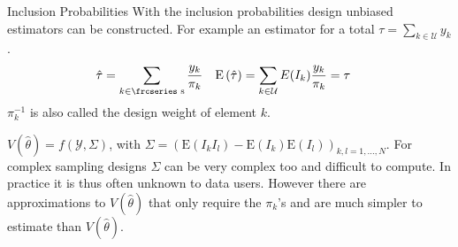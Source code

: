 \documentclass{beamer}\usepackage[]{graphicx}\usepackage[]{color}
\newcommand{\textfrc}[1]{{\frcseries#1}}
\newcommand{\mathfrc}[1]{\text{\textfrc{#1}}}
\newcommand{\E}[1]{\text{E}\left(#1\right)}
\begin{document}
\begin{frame}{Inclusion Probabilities}
With the inclusion probabilities design unbiased estimators can be constructed. For example an estimator for a total $\tau=\sum_{k \in \mathcal{U}} y_k$.
\begin{align*}
 \hat\tau &= \sum_{k \in \mathfrc{s}} \dfrac{y_k}{\pi_k} & \E{\hat\tau } &= \sum_{k \in \mathcal{U}} E(I_k) \dfrac{y_k}{\pi_k} = \tau
\end{align*}
$\pi_k^{-1}$ is also called the \alert{design weight} of element $k$.

$V(\hat\theta)=f(\mathcal{Y},\Sigma)$, with $\Sigma=(\E{I_k I_l}-\E{I_k} \E{I_l})_{k,l=1,\ldots,N}$.
For complex sampling designs $\Sigma$ can be very complex too and difficult to compute. In practice it is thus often unknown to data users. However there are approximations to $V(\hat\theta)$ that only require the $\pi_k$'s and are much simpler to estimate than $V(\hat\theta)$.

\end{frame}
\end{document}
